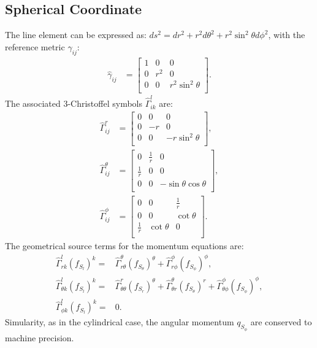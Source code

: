 \subsection*{Spherical Coordinate}
The line element can be expressed as: $ ds^2 = dr^2 + r^2 d\theta^2 + r^2\sin^2\theta d\phi^2 $, with the reference metric $\hat{\gamma}_{ij}$:
\begin{align}
	\hat{\gamma}_{ij} &= \begin{bmatrix}
		1 & 0 & 0 \\
		0 &r^2 & 0 \\
		0 & 0 &r^2 \sin^2\theta  \\
       	\end{bmatrix}.
\end{align}
The associated 3-Christoffel symbols $\hat{\Gamma}^l_{ik}$ are:
\begin{align}
	\hat{\Gamma}^r_{ij} &= \begin{bmatrix}
		0 & 0 & 0 \\
		0 &-r & 0 \\
		0 & 0 &-r \sin^2\theta  \\
       	\end{bmatrix}, \\
	\hat{\Gamma}^\theta_{ij} &= \begin{bmatrix}
		0 & \frac{1}{r} & 0 \\
		\frac{1}{r} & 0 & 0 \\
		0 & 0 & -\sin\theta\cos\theta  \\
       	\end{bmatrix}, \\
	\hat{\Gamma}^\phi_{ij} &= \begin{bmatrix}
		0 & 0 & \frac{1}{r}\\
		0 & 0 & \cot\theta \\
		\frac{1}{r} & \cot\theta & 0 \\
       	\end{bmatrix}.
\end{align}
The geometrical source terms for the momentum equations are:
\begin{align}
\hat{\Gamma}^l_{rk}(f_{S_l})^k =& \hat{\Gamma}^\theta_{r\theta}(f_{S_\theta})^\theta + \hat{\Gamma}^\phi_{r\phi}(f_{S_\phi})^\phi ,\\
\hat{\Gamma}^l_{\theta k }(f_{S_l})^k =& \hat{\Gamma}^r_{\theta \theta}(f_{S_r})^\theta + \hat{\Gamma}^\theta_{\theta r}(f_{S_\theta})^r + \hat{\Gamma}^\phi_{\theta \phi}(f_{S_\phi})^\phi ,\\ %
\hat{\Gamma}^l_{\phi k}(f_{S_l})^k =& 0.
\end{align}
Simularity, as in the cylindrical case, the angular momentum $q_{S_\phi}$ are conserved to machine precision.

